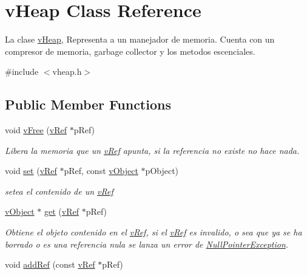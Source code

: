 \hypertarget{classv_heap}{\section{v\-Heap Class Reference}
\label{classv_heap}
}


La clase \hyperlink{classv_heap}{v\-Heap}, Representa a un manejador de memoria. Cuenta con un compresor de memoria, garbage collector y los metodos escenciales.  




{\ttfamily \#include $<$vheap.\-h$>$}

\subsection*{Public Member Functions}
\begin{DoxyCompactItemize}
\item 
void \hyperlink{classv_heap_abb964cfa76ddee4cd1cc22dae845eed4}{v\-Free} (\hyperlink{classv_ref}{v\-Ref} $\ast$p\-Ref)
\begin{DoxyCompactList}\small\item\em Libera la memoria que un \hyperlink{classv_ref}{v\-Ref} apunta, si la referencia no existe no hace nada. \end{DoxyCompactList}\item 
void \hyperlink{classv_heap_aba09b3334fc1a732308f278c9e292484}{set} (\hyperlink{classv_ref}{v\-Ref} $\ast$p\-Ref, const \hyperlink{classv_object}{v\-Object} $\ast$p\-Object)
\begin{DoxyCompactList}\small\item\em setea el contenido de un \hyperlink{classv_ref}{v\-Ref} \end{DoxyCompactList}\item 
\hyperlink{classv_object}{v\-Object} $\ast$ \hyperlink{classv_heap_ad37c93fe08d1b15f4785a58e865f14f1}{get} (\hyperlink{classv_ref}{v\-Ref} $\ast$p\-Ref)
\begin{DoxyCompactList}\small\item\em Obtiene el objeto contenido en el \hyperlink{classv_ref}{v\-Ref}, si el \hyperlink{classv_ref}{v\-Ref} es invalido, o sea que ya se ha borrado o es una referencia nula se lanza un error de \hyperlink{class_null_pointer_exception}{Null\-Pointer\-Exception}. \end{DoxyCompactList}\item 
void \hyperlink{classv_heap_a4691f4ba088fe19eb2bcaedf90205eb5}{add\-Ref} (const \hyperlink{classv_ref}{v\-Ref} $\ast$p\-Ref)

\end{DoxyCompactItemize}
